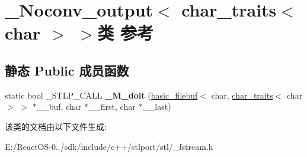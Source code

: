 \hypertarget{class___noconv__output_3_01char__traits_3_01char_01_4_01_4}{}\section{\+\_\+\+Noconv\+\_\+output$<$ char\+\_\+traits$<$ char $>$ $>$类 参考}
\label{class___noconv__output_3_01char__traits_3_01char_01_4_01_4}
\subsection*{静态 Public 成员函数}
\begin{DoxyCompactItemize}
\item 
\mbox{\label{class___noconv__output_3_01char__traits_3_01char_01_4_01_4_ab42189814ae3669e44832e0bed2273ea}} 
static bool \+\_\+\+S\+T\+L\+P\+\_\+\+C\+A\+LL {\bfseries \+\_\+\+M\+\_\+doit} (\hyperlink{classbasic__filebuf}{basic\+\_\+filebuf}$<$ char, \hyperlink{classchar__traits}{char\+\_\+traits}$<$ char $>$ $>$ $\ast$\+\_\+\+\_\+buf, char $\ast$\+\_\+\+\_\+first, char $\ast$\+\_\+\+\_\+last)
\end{DoxyCompactItemize}


该类的文档由以下文件生成\+:\begin{DoxyCompactItemize}
\item 
E\+:/\+React\+O\+S-\/0../sdk/include/c++/stlport/stl/\+\_\+fstream.\+h\end{DoxyCompactItemize}
